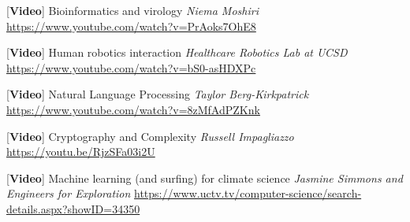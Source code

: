 \documentclass[12pt, oneside]{article}
\begin{document}
[{\bf Video}] Bioinformatics and virology {\it Niema Moshiri}
{\small \url{https://www.youtube.com/watch?v=PrAoks7OhE8}}

[{\bf Video}] Human robotics interaction {\it Healthcare Robotics Lab at UCSD}
{\small \url{https://www.youtube.com/watch?v=bS0-asHDXPc}}

[{\bf Video}] Natural Language Processing {\it Taylor Berg-Kirkpatrick}
{\small \url{https://www.youtube.com/watch?v=8zMfAdPZKnk}}

[{\bf Video}] Cryptography and Complexity {\it Russell Impagliazzo}
{\small \url{https://youtu.be/RjzSFa03i2U}}

[{\bf Video}] Machine learning (and surfing) for climate science {\it Jasmine Simmons and Engineers for Exploration}
{\small \url{https://www.uctv.tv/computer-science/search-details.aspx?showID=34350}}
\end{document}
